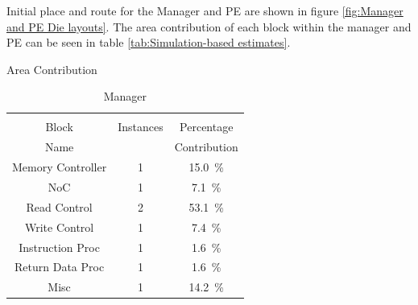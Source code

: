 \documentclass[journal]{IEEEtran}
\begin{document}
Initial place and route for the Manager and PE are shown in figure \ref{fig:Manager and PE Die layouts}. 
The area contribution of each block within the manager and PE can be seen in table \ref{tab:Simulation-based estimates}.
\begin{table}[h]
  \captionsetup{justification=centering, skip=3pt}
  \caption{Area Contribution}
  \vspace{3pt}
  \label{tab:Simulation-based estimates}
  \centering
  \begin{subtable}{0.5\textwidth}
    \centering
    \begin{adjustbox}{width=0.75\textwidth}
      \begin{tabular}{ccc}
        \toprule
                         &          &                                         \\  %
            Block        &Instances &Percentage                               \\  %
            Name         &          &Contribution                             \\  %
        \hline  %
  Memory Controller      & 1&\SI[per-mode=symbol]{15.0}{\percent}  \\ 
        NoC              & 1&\SI[per-mode=symbol]{ 7.1}{\percent}  \\
        Read Control     & 2&\SI[per-mode=symbol]{53.1}{\percent}  \\
        Write Control    & 1&\SI[per-mode=symbol]{ 7.4}{\percent}  \\
      Instruction Proc   & 1&\SI[per-mode=symbol]{ 1.6}{\percent}  \\
      Return Data Proc   & 1&\SI[per-mode=symbol]{ 1.6}{\percent}  \\
        Misc             & 1&\SI[per-mode=symbol]{14.2}{\percent}  \\
        \bottomrule
      \end{tabular}
    \end{adjustbox}
    \vspace{3pt}
    \captionsetup{justification=centering, skip=10pt}
    \caption{Manager}
    \label{tab:Manager Area Contribution}
  \end{subtable}

\end{table}
\end{document}
